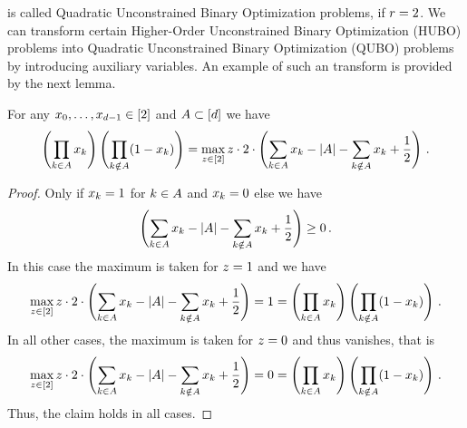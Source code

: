  is called Quadratic Unconstrained Binary Optimization problems, if $r=2$.
We can transform certain Higher-Order Unconstrained Binary Optimization (HUBO) problems into Quadratic Unconstrained Binary Optimization (QUBO) problems by introducing auxiliary variables.
An example of such an transform is provided by the next lemma.

\begin{lemma}
    \label{lem:monomialToQUBO}
    For any ${x_{0},\ldots,x_{d-1}}\in[2]$ and $A\subset[d]$ we have
    \begin{align*}
        \left( \prod_{\atomenumerator\in\variableset} \atomlegindexof{\atomenumerator } \right)  \left(  \prod_{\atomenumerator\notin\variableset} (1- \atomlegindexof{\atomenumerator }) \right) =
        \max_{\slackvariable\in[2]} \slackvariable \cdot 2 \cdot \left( \sum_{\atomenumerator\in\variableset}\atomlegindexof{\atomenumerator}  - \cardof{\variableset} - \sum_{\atomenumerator\notin\variableset}\atomlegindexof{\atomenumerator} + \frac{1}{2} \right) \, . %
    \end{align*}
\end{lemma}
\begin{proof} %
    Only if $x_{k}=1$ for $k\in A$ and $x_{k}=0$ else we have
    \[ \left( \sum_{k\in A}x_{k}  - \left|A\right| - \sum_{k\notin A}x_{k} + \frac{1}{2} \right) \geq 0 \, . \]
    In this case the maximum is taken for $z=1$ and we have
    \[ \max_{z\in[2]} z \cdot 2 \cdot \left( \sum_{k\in A}x_{k}  - \left|A\right| - \sum_{k\notin A}x_{k} + \frac{1}{2} \right)
    = 1 = \left( \prod_{k\in A} x_{k } \right)  \left(  \prod_{k\notin A} (1- x_{k }) \right) \, . \]
    In all other cases, the maximum is taken for $z=0$ and thus vanishes, that is
    \[ \max_{z\in[2]} z \cdot 2 \cdot \left( \sum_{k\in A}x_{k}  - \left|A\right| - \sum_{k\notin A}x_{k} + \frac{1}{2} \right)
    = 0 = \left( \prod_{k\in A} x_{k } \right)  \left(  \prod_{k\notin A} (1- x_{k }) \right) \, . \]
    Thus, the claim holds in all cases.
\end{proof}

